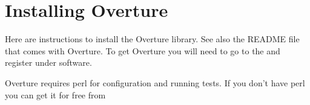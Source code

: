 \documentclass{article}
\begin{document}
% 

\clearpage
\section{Installing Overture}\label{sec:installingOverture}

Here are instructions to install the Overture library. See also the README file that comes with Overture.
To get Overture you will need to go to the 
and register under software.

Overture requires perl for configuration and running tests. If you don't have perl you
can get it for free from 
\end{document}
